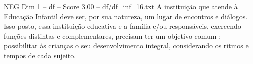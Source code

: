 \begin{textsample}{NEG Dim 1 – df – Score 3.00 – df/df\_inf\_16.txt}
A instituição que atende à Educação Infantil deve ser, por sua natureza, um lugar de encontros e diálogos.
Isso posto, essa instituição educativa e a família e/ou responsáveis, exercendo funções distintas e complementares, precisam ter um objetivo comum : possibilitar às crianças o seu desenvolvimento integral, considerando os ritmos e tempos de cada sujeito.

\end{textsample}
